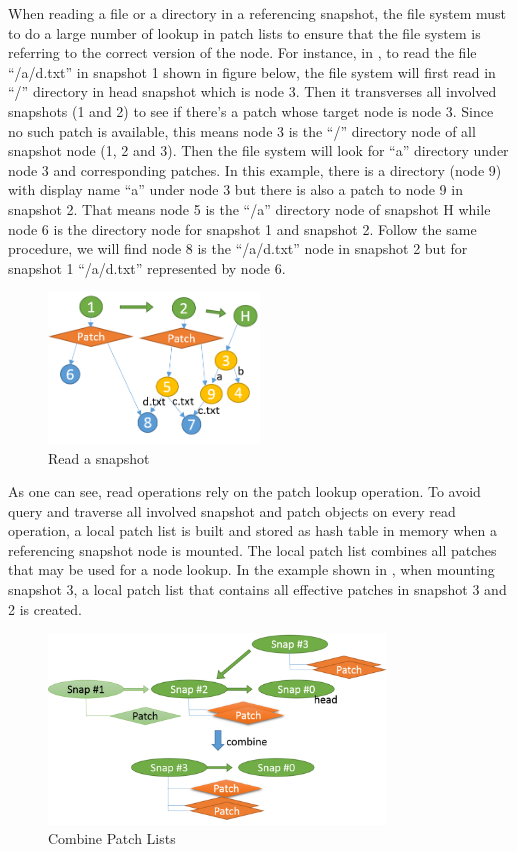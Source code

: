     When reading a file or a directory in a referencing snapshot, the file system must to do a large number of lookup in patch lists to ensure that the file system is referring to the correct version of the node. For instance, in , to read the file ``/a/d.txt'' in snapshot 1 shown in figure below, the file system will first read in ``/'' directory in head snapshot which is node 3. Then it transverses all involved snapshots (1 and 2) to see if there's a patch whose target node is node 3. Since no such patch is available, this means node 3 is the ``/'' directory node of all snapshot node (1, 2 and 3). Then the file system will look for “a” directory under node 3 and corresponding patches. In this example, there is a directory (node 9) with display name “a” under node 3 but there is also a patch to node 9 in snapshot 2. That means node 5 is the ``/a'' directory node of snapshot H while node 6 is the directory node for snapshot 1 and snapshot 2. Follow the same procedure, we will find node 8 is the ``/a/d.txt'' node in snapshot 2 but for snapshot 1 ``/a/d.txt'' represented by node 6.

\begin{figure}[t]
\centering
\includegraphics[width=0.5\textwidth]{Chapter-4/figs/fig18.png}
\caption{Read a snapshot}
\label{fig:read_patches}
\end{figure}

    As one can see, read operations rely on the patch lookup operation. To avoid query and traverse all involved snapshot and patch objects on every read operation, a local patch list is built and stored as hash table in memory when a referencing snapshot node is mounted. The local patch list combines all patches that may be used for a node lookup. In the example shown in , when mounting snapshot 3, a local patch list that contains all effective patches in snapshot 3 and 2 is created.

\begin{figure}[t]
\centering
\includegraphics[width=0.8\textwidth]{Chapter-4/figs/fig15.png}
\caption{Combine Patch Lists}
\label{fig:combine_patch_list}
\end{figure}

